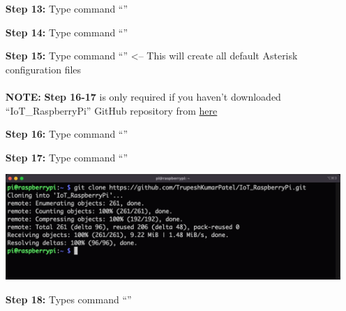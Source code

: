 \begin{itemize}[leftmargin=1.7cm]
			\item[\textbf{Step 13:}] Type command ``{\selectfont{sudo make}}''
			\item[\textbf{Step 14:}] Type command ``{\selectfont{sudo make install}}''
			\item[\textbf{Step 15:}] Type command ``{\selectfont{sudo make samples}}'' <-- This will create all default Asterisk configuration files\\\\
			\danger\textbf{NOTE:} \textbf{Step 16-17} is only required if you haven't downloaded ``IoT\_RaspberryPi'' GitHub repository from \href{https://github.com/TrupeshKumarPatel/IoT_RaspberryPi}{here}  \danger\\
			\item[\textbf{Step 16\danger:}] Type command ``{\selectfont{cd ~}}''
			\item[\textbf{Step 17\danger:}] Type command ``{\selectfont{git clone https://github.com/TrupeshKumarPatel/IoT\_RaspberryPi.git}}''\\
				\begin{minipage}{\textwidth}
					\vspace{2mm}
					\includegraphics[scale=0.35]{Images/raspberry_pi/eduroam_config/clone_git.png}
					\vspace{2mm}
				\end{minipage}
			\item[\textbf{Step 18:}] Types command ``{\selectfont{sudo cp -R ~/IoT\_RaspberryPi/source\_code/asterisk\_config/* /etc/asterisk/}}''
		\end{itemize}

\pagebreak
